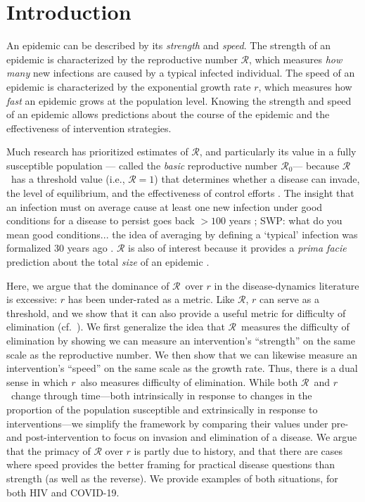 \documentclass[12pt]{article}
\newcommand{\RR}{\ensuremath{{\mathcal R}}}
\newcommand{\Rx}[1]{\ensuremath{\RR_{\mathrm{#1}}}}
\newcommand{\Ro}{\Rx{0}}
\newcommand{\rr}{\ensuremath{{r}}}
\begin{document}
\pagebreak

\section{Introduction}

An epidemic can be described by its \emph{strength} and \emph{speed}.
The strength of an epidemic is characterized by the reproductive number \RR, which measures \emph{how many} new infections are caused by a typical infected individual.
The speed of an epidemic is characterized by the exponential growth rate $r$, which measures how \emph{fast} an epidemic grows at the population level.
Knowing the strength and speed of an epidemic allows predictions about the course of the epidemic and the effectiveness of intervention strategies.

Much research has prioritized estimates of \RR, and particularly its value in a fully susceptible population --- called the \emph{basic} reproductive number \Ro --- because \RR\ has a threshold value (i.e., $\RR=1$) that determines whether a disease can invade, the level of equilibrium, and the effectiveness of control efforts \citep{anderson1991infectious, diekmann1990definition}.
The insight that an infection must on average cause at least one new infection under good conditions for a disease to persist goes back $>100$ years \citep{ross1911prevention}; SWP: what do you mean good conditions...
the idea of averaging by defining a `typical' infection was formalized 30 years ago \citep{diekmann1990definition}.
$\RR$ is also of interest because it provides a \emph{prima facie} prediction about the total \emph{size} of an epidemic \citep{anderson1991infectious, ma2006generality, arino2007final, andreasen2011final, miller2012note}.

Here, we argue that the dominance of \RR\ over $r$ in the disease-dynamics literature is excessive: $r$ has been under-rated as a metric. Like \RR,  $r$ can serve as a threshold, and we show that it can also provide a useful metric for difficulty of elimination (cf.~\cite{ferretti2020quantifying}). 
We first generalize the idea that \RR\ measures the difficulty of elimination by showing we can measure an intervention's ``strength'' on the same scale as the reproductive number. 
We then show that we can likewise measure an intervention's ``speed'' on the same scale as the growth rate.
Thus, there is a dual sense in which \rr\ also measures difficulty of elimination. 
While both \RR\ and \rr\ change through time---both intrinsically in response to changes in the proportion of the population susceptible and extrinsically in response to interventions---we simplify the framework by comparing their values under pre- and post-intervention to focus on invasion and elimination of a disease.
We argue that the primacy of $\RR$ over $r$ is partly due to history, and that there are cases where speed provides the better framing for practical disease questions than strength (as well as the reverse). We provide examples of both situations, for both HIV and COVID-19.
\end{document}
